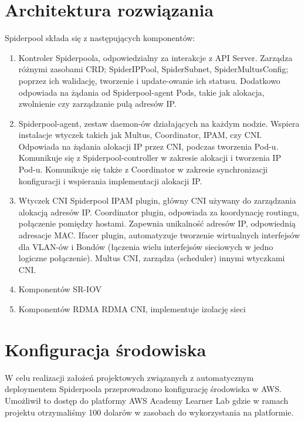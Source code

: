 \documentclass[onecolumn,12pt]{article}
\begin{document}
\section{Architektura rozwiązania}
Spiderpool składa się z następujących komponentów:
\begin{enumerate}
    \item Kontroler Spiderpoola, odpowiedzialny za interakcje z API Server. 
    Zarządza różnymi zasobami CRD; SpiderIPPool, SpiderSubnet, SpiderMultusConfig; poprzez ich walidację, tworzenie i update-owanie ich statusu. 
    Dodatkowo odpowiada na żądania od Spiderpool-agent Pods, takie jak alokacja, zwolnienie czy zarządzanie pulą adresów IP. 
    \item Spiderpool-agent, zestaw daemon-ów działających na każdym nodzie. 
    Wspiera instalacje wtyczek takich jak Multus, Coordinator, IPAM, czy CNI. 
    Odpowiada na żądania alokacji IP przez CNI, podczas tworzenia Pod-u. 
    Komunikuje się z Spiderpool-controller w zakresie alokacji i tworzenia IP Pod-u. 
    Komunikuje się także z Coordinator w zakresie synchronizacji konfiguracji i wspierania implementacji alokacji IP.
    \item Wtyczek CNI
    \newline Spiderpool IPAM plugin, główny CNI używany do zarządzania alokacją adresów IP.
    \newline Coordinator plugin, odpowiada za koordynację routingu, połączenie pomiędzy hostami. 
    Zapewnia unikalność adresów IP, odpowiednią adresacje MAC.
    \newline Ifacer plugin, automatyzuje tworzenie wirtualnych interfejsów dla VLAN-ów i Bondów (łączenia wielu interfejsów sieciowych w jedno logiczne połączenie).
    \newline Multus CNI, zarządza (scheduler) innymi wtyczkami CNI.
    \item Komponentów SR-IOV
    \item Komponentów RDMA
    \newline RDMA CNI, implementuje izolację sieci
\end{enumerate}


\section{Konfiguracja środowiska}

W celu realizacji założeń projektowych związanych z automatycznym deploymentem Spiderpoola 
przeprowadzono konfigurację środowiska w AWS. Umożliwił to dostęp do platformy AWS Academy Learner
Lab gdzie w ramach projektu otrzymaliśmy 100 dolarów w zasobach do wykorzystania na platformie. 
\end{document}
